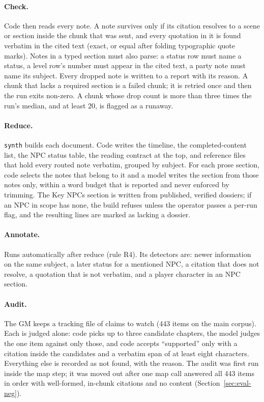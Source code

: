 \documentclass[11pt]{article}
\newcommand{\code}[1]{\texttt{#1}}
\begin{document}
\paragraph{Check.} Code then reads every note. A note survives only if its citation
resolves to a scene or section inside the chunk that was sent, and every quotation in it
is found verbatim in the cited text (exact, or equal after folding typographic quote
marks). Notes in a typed section must also parse: a status row must name a status, a
level row's number must appear in the cited text, a party note must name its subject.
Every dropped note is written to a report with its reason. A chunk that lacks a required
section is a failed chunk; it is retried once and then the run exits non-zero. A chunk
whose drop count is more than three times the run's median, and at least 20, is flagged
as a runaway.

\paragraph{Reduce.} \code{synth} builds each document. Code writes the timeline, the
completed-content list, the NPC status table, the reading contract at the top, and
reference files that hold every routed note verbatim, grouped by subject. For each prose
section, code selects the notes that belong to it and a model writes the section from
those notes only, within a word budget that is reported and never enforced by trimming.
The Key NPCs section is written from published, verified dossiers; if an NPC in scope has
none, the build refuses unless the operator passes a per-run flag, and the resulting
lines are marked as lacking a dossier.

\paragraph{Annotate.} Runs automatically after reduce (rule R4). Its detectors are:
newer information on the same subject, a later status for a mentioned NPC, a citation
that does not resolve, a quotation that is not verbatim, and a player character in an
NPC section.

\paragraph{Audit.} The GM keeps a tracking file of claims to watch (443 items on the
main corpus). Each is judged alone: code picks up to three candidate chapters, the model
judges the one item against only those, and code accepts ``supported'' only with a
citation inside the candidates and a verbatim span of at least eight characters.
Everything else is recorded as not found, with the reason. The audit was first run
inside the map step; it was moved out after one map call answered all 443 items in
order with well-formed, in-chunk citations and no content
(Section~\ref{sec:eval-neg}).
\end{document}

